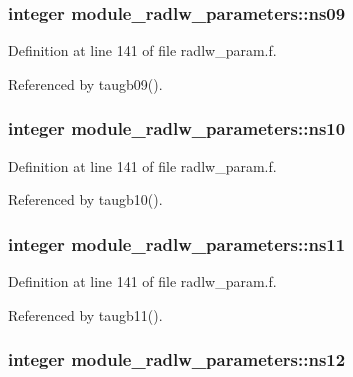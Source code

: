 \subsubsection[{\texorpdfstring{ns09}{ns09}}]{\setlength{\rightskip}{0pt plus 5cm}integer module\+\_\+radlw\+\_\+parameters\+::ns09}\hypertarget{group__module__radlw__main_ga8948c9fe0a0f209c62e17e7c526940b8}{}\label{group__module__radlw__main_ga8948c9fe0a0f209c62e17e7c526940b8}


Definition at line 141 of file radlw\+\_\+param.\+f.



Referenced by taugb09().

\subsubsection[{\texorpdfstring{ns10}{ns10}}]{\setlength{\rightskip}{0pt plus 5cm}integer module\+\_\+radlw\+\_\+parameters\+::ns10}\hypertarget{group__module__radlw__main_ga66d1bbe720448a035ccf689d77418cd5}{}\label{group__module__radlw__main_ga66d1bbe720448a035ccf689d77418cd5}


Definition at line 141 of file radlw\+\_\+param.\+f.



Referenced by taugb10().

\subsubsection[{\texorpdfstring{ns11}{ns11}}]{\setlength{\rightskip}{0pt plus 5cm}integer module\+\_\+radlw\+\_\+parameters\+::ns11}\hypertarget{group__module__radlw__main_gace01958b71c7f6923fd9b3ba39b3b668}{}\label{group__module__radlw__main_gace01958b71c7f6923fd9b3ba39b3b668}


Definition at line 141 of file radlw\+\_\+param.\+f.



Referenced by taugb11().

\subsubsection[{\texorpdfstring{ns12}{ns12}}]{\setlength{\rightskip}{0pt plus 5cm}integer module\+\_\+radlw\+\_\+parameters\+::ns12}\hypertarget{group__module__radlw__main_gaabdc77471aadc2932eb213f3b7ecb66c}{}\label{group__module__radlw__main_gaabdc77471aadc2932eb213f3b7ecb66c}


